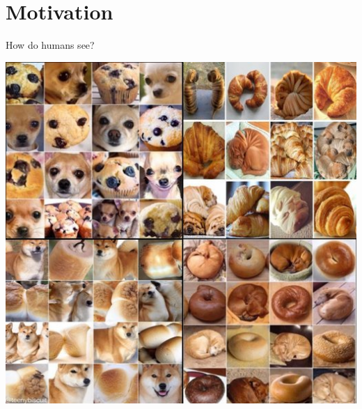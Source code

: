 \documentclass[default, aspectratio=169]{beamer}
\begin{document}
	\section{Motivation}
	\begin{frame}{How do humans see?}
		
		\begin{center}
			\includegraphics[keepaspectratio, scale=0.334]{pic/how.png}

\end{center}
\end{frame}
\end{document}
